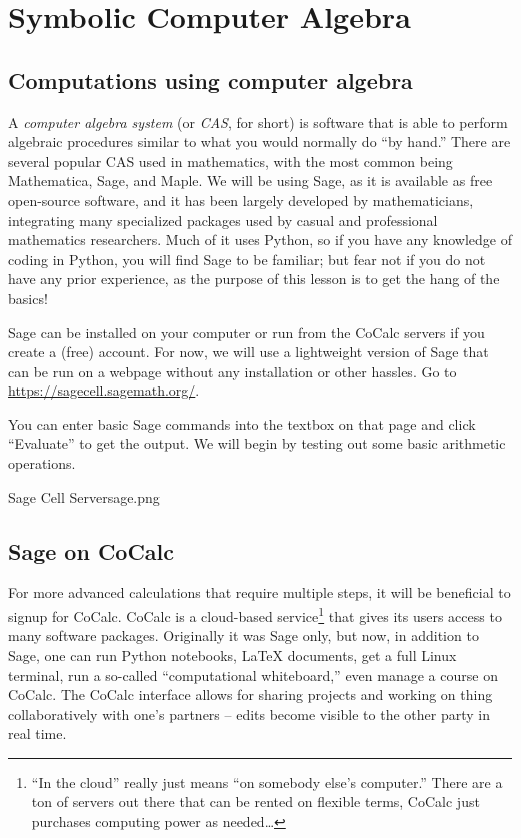 \chapter{Symbolic Computer Algebra}

\section{Computations using computer algebra}

A \textit{computer algebra system} (or \textit{CAS}, for short) is software
that is able to perform algebraic procedures similar to what you would
normally do ``by hand.'' There are several popular CAS used in mathematics,
with the most common being Mathematica, Sage, and Maple. We will
be using Sage, as it is available as free open-source software, and it has been
largely developed by mathematicians, integrating many specialized packages
used by casual and professional mathematics researchers. Much of it
uses Python, so if you have any knowledge of coding in Python, you will find
Sage to be familiar; but fear not if you do not have any prior experience,
as the purpose of this lesson is to get the hang of the basics!

Sage can be installed on your computer or run from the CoCalc servers
if you create a (free) account. For now, we will use a lightweight version of Sage
that can be run on a webpage without any installation or other hassles.
 Go to \url{https://sagecell.sagemath.org/}.

You can enter basic Sage commands into the textbox on that page and
click ``Evaluate'' to get the output. We will begin by testing out some basic
arithmetic operations.

\clearpage
\begin{worksheet}{6}{Sage Cell Server}{sage.png}

\end{worksheet}
\clearpage



\section{Sage on CoCalc}

For more advanced calculations that require multiple
steps, it will be beneficial to signup for CoCalc. CoCalc is a cloud-based service\footnote{``In the cloud'' really just means ``on somebody else's computer.''  There are a ton of servers out there that can be rented on flexible terms, CoCalc just purchases computing power as needed\dots} that gives its users access to many software packages.  Originally it was Sage only, but now, in addition to Sage,  one can run Python notebooks, \LaTeX{} documents, get a full Linux terminal, run a so-called ``computational whiteboard,'' even manage a course on CoCalc.  The CoCalc interface allows for sharing projects and working on thing collaboratively with one's partners -- edits become visible to the other party in real time.

